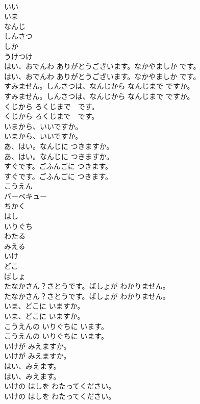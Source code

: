 \documentclass[8pt]{extreport}
\begin{document}
\begin{CJK}{UTF8}{min}
\\	いい
\\	いま
\\	なんじ
\\	しんさつ
\\	しか
\\	うけつけ
\\	はい、おでんわ ありがとうございます。なかやましか です。	
\\	はい、おでんわ ありがとうございます。なかやましか です。 
\\	すみません。しんさつは、なんじから なんじまで ですか。	
\\	すみません。しんさつは、なんじから なんじまで ですか。 
\\	くじから ろくじまで　です。	
\\	くじから ろくじまで　です。 
\\	いまから、いいですか。	
\\	いまから、いいですか。 
\\	あ、はい。なんじに つきますか。	
\\	あ、はい。なんじに つきますか。 
\\	すぐです。ごふんごに つきます。	
\\	すぐです。ごふんごに つきます。 
\\	こうえん
\\	バーベキュー
\\	ちかく
\\	はし
\\	いりぐち
\\	わたる
\\	みえる
\\	いけ
\\	どこ
\\	ばしょ
\\	たなかさん？さとうです。ばしょが わかりません。	
\\	たなかさん？さとうです。ばしょが わかりません。 
\\	いま、どこに いますか。	
\\	いま、どこに いますか。 
\\	こうえんの いりぐちに います。	
\\	こうえんの いりぐちに います。 
\\	いけが みえますか。	
\\	いけが みえますか。 
\\	はい、みえます。	
\\	はい、みえます。 
\\	いけの はしを わたってください。	
\\	いけの はしを わたってください。 

\end{CJK}
\end{document}
